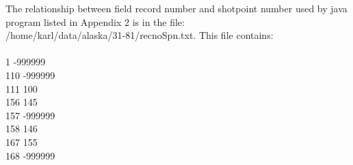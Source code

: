 The relationship between field record number and shotpoint number used by java program listed in Appendix 2 is in the file: \\
/home/karl/data/alaska/31-81/recnoSpn.txt.  This file contains: \\
  \\
1 -999999 \\
110 -999999 \\
111 100 \\
156 145 \\
157 -999999 \\
158 146 \\
167 155 \\
168 -999999
